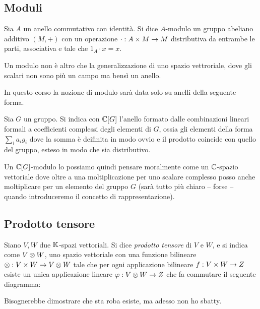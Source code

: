 \subsection{Moduli}
  \begin{mydef}
    Sia $A$ un anello commutativo con identità. Si dice $A$-modulo un gruppo abeliano additivo $(M,+)$ con un operazione $\cdot: A\times M \rightarrow M$ distributiva da entrambe le parti, associativa e tale che $1_A \cdot x = x$.
  \end{mydef}
  
  Un modulo non è altro che la generalizzazione di uno spazio vettroriale, dove gli scalari non sono più un campo ma bensì un anello.
  
  In questo corso la nozione di modulo sarà data solo su anelli della seguente forma.
  \begin{mydef}
    Sia $G$ un gruppo. Si indica con $\mathbb C[G]$ l'anello formato dalle combinazioni lineari formali a coefficienti complessi degli elementi di $G$, ossia gli elementi della forma $\sum_i a_ig_i$ dove la somma è deifinita in modo ovvio e il prodotto coincide con quello del gruppo, esteso in modo che sia distributivo. 
  \end{mydef}
  
  Un $\mathbb C[G]$-modulo lo possiamo quindi pensare moralmente come un $\mathbb C$-spazio vettoriale dove oltre a una moltiplicazione per uno scalare complesso posso anche moltiplicare per un elemento del gruppo $G$ (sarà tutto più chiaro -- forse -- quando introduceremo il concetto di rappresentazione).

\subsection{Prodotto tensore}
  \begin{mydef}
    Siano $V, W$ due $\mathbb K$-spazi vettoriali. Si dice \emph{prodotto tensore} di $V$ e $W$, e si indica come $V\otimes W$, uno spazio vettoriale con una funzione bilineare $\otimes: V \times W \rightarrow V\otimes W$ tale che per ogni applicazione bilineare $f: V\times W \rightarrow Z$ esiste un unica applicazione lineare $\varphi: V\otimes W \rightarrow Z$ che fa commutare il seguente diagramma:
    
  
  \end{mydef}
  
  Bisognerebbe dimostrare che sta roba esiste, ma adesso non ho sbatty.

